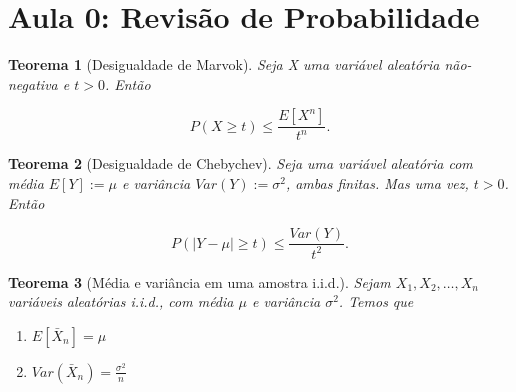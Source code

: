 \documentclass{article}
\newtheorem{theorem}{Teorema}
\begin{document}
	\textbf{}
	\vspace{2.6mm}
	
	\textbf{}
	\vspace{2.6mm}
	
	\textbf{}
	\vspace{2.6mm}
	
	\textbf{}
	\vspace{2.6mm}
	
	\textbf{}
	\vspace{2.6mm}
	
	\textbf{}
	\vspace{2.6mm}
	
	\textbf{}
	\vspace{2.6mm}
	
	\textbf{}
	\vspace{2.6mm}
	
	\textbf{}
	
	\newpage
	
	\section*{Aula 0: Revisão de Probabilidade}
	\label{s0}
	
	\begin{theorem}[Desigualdade de Marvok]
		Seja X uma variável aleatória não-negativa e $t > 0$. Então
		
		\begin{equation}
			P(X \geq t) \leq \frac{E[X^n]}{t^n}.
		\end{equation}
	\end{theorem}
	
	\begin{theorem}[Desigualdade de Chebychev]
		Seja uma variável aleatória com média $E[Y] := \mu$ e variância $Var(Y) := \sigma^2$, ambas finitas. Mas uma vez, $t > 0$. Então
		
		\begin{equation}
			P(|Y - \mu| \geq t) \leq \frac{Var(Y)}{t^2}.
		\end{equation}
	\end{theorem}
	
	\begin{theorem}[Média e variância em uma amostra i.i.d.]
		Sejam $X_1, X_2, \ldots, X_n$ variáveis aleatórias i.i.d., com média $\mu$ e variância $\sigma^2$. Temos que
		
		\begin{enumerate}
			\item[(i)] $E[\bar{X}_n] = \mu$
			\item[(ii)] $Var(\bar{X}_n) = \frac{\sigma^2}{n}$
		\end{enumerate}
	\end{theorem}
	
\end{document}
